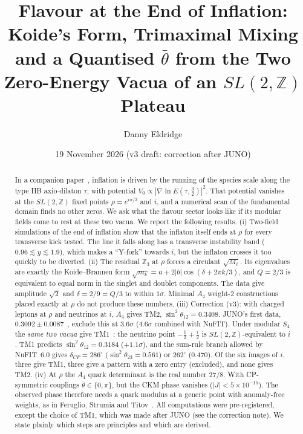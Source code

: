 \documentclass[aps,prd,twocolumn,superscriptaddress,nofootinbib,showkeys]{revtex4-2}
\begin{document}
\title{Flavour at the End of Inflation: Koide's Form, Trimaximal Mixing and a Quantised $\bar\theta$ from the Two Zero-Energy Vacua of an $SL(2,\mathbb Z)$ Plateau}
\author{Danny Eldridge}
\date{19 November 2026 (v3 draft: correction after JUNO)}
\begin{abstract}
In a companion paper~\cite{P1}, inflation is driven by the running of the species scale along the type IIB axio-dilaton $\tau$, with potential $V_0\propto|\nabla\ln E(\tau,\tfrac32)|^2$. That potential vanishes at the $SL(2,\mathbb Z)$ fixed points $\rho=e^{i\pi/3}$ and $i$, and a numerical scan of the fundamental domain finds no other zeros. We ask what the flavour sector looks like if its modular fields come to rest at these two vacua. We report the following results.
(i) Two-field simulations of the end of inflation show that the inflaton itself ends at $\rho$ for every transverse kick tested. The line it falls along has a transverse instability band ($0.96\lesssim y\lesssim1.9$), which makes a ``Y-fork'' towards $i$, but the inflaton crosses it too quickly to be diverted.
(ii) The residual $\mathbb Z_3$ at $\rho$ forces a circulant $\sqrt{M_\ell}$. Its eigenvalues are exactly the Koide--Brannen form $\sqrt{m_k}=a+2|b|\cos(\delta+2\pi k/3)$, and $Q=2/3$ is equivalent to equal norm in the singlet and doublet components. The data give amplitude $\sqrt2$ and $\delta=2/9=Q/3$ to within $1\sigma$. Minimal $A_4$ weight-2 constructions placed exactly at $\rho$ do not produce these numbers.
(iii) Correction (v3): with charged leptons at $\rho$ and neutrinos at $i$, $A_4$ gives TM2, $\sin^2\theta_{12}=0.3408$. JUNO's first data, $0.3092\pm0.0087$~\cite{JUNO}, exclude this at $3.6\sigma$ ($4.6\sigma$ combined with NuFIT). Under modular $S_4$ the \emph{same two vacua} give TM1~\cite{TM1}: the neutrino point $-\tfrac12+\tfrac i2$ is $SL(2,\mathbb Z)$-equivalent to $i$. TM1 predicts $\sin^2\theta_{12}=0.3184$ ($+1.1\sigma$), and the sum-rule branch allowed by NuFIT~6.0 gives $\delta_{CP}=286^\circ$ ($\sin^2\theta_{23}=0.561$) or $262^\circ$ ($0.470$). Of the six images of $i$, three give TM1, three give a pattern with a zero entry (excluded), and none gives TM2.
(iv) At $\rho$ the $A_4$ quark determinant is the real number $27/8$. With CP-symmetric couplings $\bar\theta\in\{0,\pi\}$, but the CKM phase vanishes ($|J|<5\times10^{-15}$). The observed phase therefore needs a quark modulus at a generic point with anomaly-free weights, as in Feruglio, Strumia and Titov~\cite{FST}.
All computations were pre-registered, except the choice of TM1, which was made after JUNO (see the correction note). We state plainly which steps are principles and which are derived.
\end{abstract}
\maketitle
\end{document}

